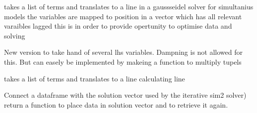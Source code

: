 \documentclass[letterpaper,10pt,english]{sphinxmanual}
\begin{document}
\begin{fulllineitems}
\begin{fulllineitems}
\end{fulllineitems}


\begin{fulllineitems}
\label{\detokenize{index:modelclass.BaseModel.make_gaussline}}
\pysigstartsignatures
{}
\pysigstopsignatures
\sphinxAtStartPar
takes a list of terms and translates to a line in a gauss\sphinxhyphen{}seidel solver for
simultanius models
the variables are mapped to position in a vector which has all relevant varaibles lagged
this is in order to provide opertunity to optimise data and solving

\sphinxAtStartPar
New version to take hand of several lhs variables. Dampning is not allowed for
this. But can easely be implemented by makeing a function to multiply tupels

\end{fulllineitems}


\begin{fulllineitems}
\label{\detokenize{index:modelclass.BaseModel.make_resline}}
\pysigstartsignatures
{}
\pysigstopsignatures
\sphinxAtStartPar
takes a list of terms and translates to a line calculating line

\end{fulllineitems}


\begin{fulllineitems}
\label{\detokenize{index:modelclass.BaseModel.createstuff3}}
\pysigstartsignatures
{}
\pysigstopsignatures
\sphinxAtStartPar
Connect a dataframe with the solution vector used by the iterative sim2 solver)
return a function to place data in solution vector and to retrieve it again.

\end{fulllineitems}


\end{fulllineitems}
\end{document}
